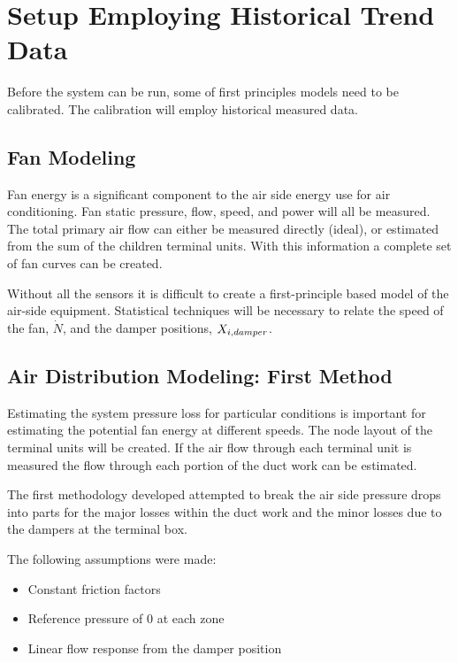 \section{Setup Employing Historical Trend Data}

Before the system can be run, some of first principles models need to be calibrated. The calibration will employ historical measured data.

\subsection{Fan Modeling}

Fan energy is a significant component to the air side energy use for air conditioning. Fan static pressure, flow, speed, and power will all be measured. The total primary air flow can either be measured directly (ideal), or estimated from the sum of the children terminal units. With this information a complete set of fan curves can be created. 

Without all the sensors it is difficult to create a first-principle based model of the air-side equipment. Statistical techniques will be necessary to relate the speed of the fan, \(\dot N\), and the damper positions, \(X_{i,damper}\). 

\subsection{Air Distribution Modeling: First Method}

Estimating the system pressure loss for particular conditions is important for estimating the potential fan energy at different speeds. The node layout of the terminal units will be created. If the air flow through each terminal unit is measured the flow through each portion of the duct work can be estimated. 

The first methodology developed attempted to break the air side pressure drops into parts for the major losses within the duct work and the minor losses due to the dampers at the terminal box. 

The following assumptions were made:

\begin{itemize}
    \item Constant friction factors
    \item Reference pressure of 0 at each zone
    \item Linear flow response from the damper position
\end{itemize}

